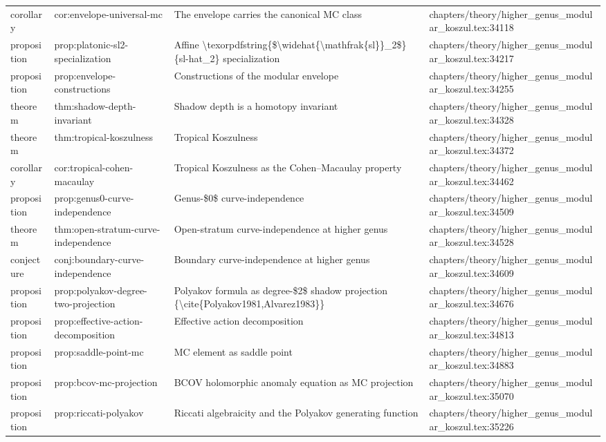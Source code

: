 \documentclass[11pt]{article}
\begin{document}
\begin{longtable}{L{0.10\textwidth}L{0.26\textwidth}L{0.42\textwidth}L{0.22\textwidth}}
corollary & cor:envelope-universal-mc & The envelope carries the canonical MC class & chapters/theory/higher\_genus\_modular\_koszul.tex:34118\\
proposition & prop:platonic-sl2-specialization & Affine \textbackslash{}texorpdfstring\{\$\textbackslash{}widehat\{\textbackslash{}mathfrak\{sl\}\}\_2\$\}\{sl-hat\_2\} specialization & chapters/theory/higher\_genus\_modular\_koszul.tex:34217\\
proposition & prop:envelope-constructions & Constructions of the modular envelope & chapters/theory/higher\_genus\_modular\_koszul.tex:34255\\
theorem & thm:shadow-depth-invariant & Shadow depth is a homotopy invariant & chapters/theory/higher\_genus\_modular\_koszul.tex:34328\\
theorem & thm:tropical-koszulness & Tropical Koszulness & chapters/theory/higher\_genus\_modular\_koszul.tex:34372\\
corollary & cor:tropical-cohen-macaulay & Tropical Koszulness as the Cohen--Macaulay property & chapters/theory/higher\_genus\_modular\_koszul.tex:34462\\
proposition & prop:genus0-curve-independence & Genus-\$0\$ curve-independence & chapters/theory/higher\_genus\_modular\_koszul.tex:34509\\
theorem & thm:op{}en-stratum-curve-independence & Op{}en-stratum curve-independence at higher genus & chapters/theory/higher\_genus\_modular\_koszul.tex:34528\\
conjecture & conj:boundary-curve-independence & Boundary curve-independence at higher genus & chapters/theory/higher\_genus\_modular\_koszul.tex:34609\\
proposition & prop:polyakov-degree-two-projection & Polyakov formula as degree-\$2\$ shadow projection \{\textbackslash{}cite\{Polyakov1981,Alvarez1983\}\} & chapters/theory/higher\_genus\_modular\_koszul.tex:34676\\
proposition & prop:effective-action-decomposition & Effective action decomposition & chapters/theory/higher\_genus\_modular\_koszul.tex:34813\\
proposition & prop:saddle-point-mc & MC element as saddle point & chapters/theory/higher\_genus\_modular\_koszul.tex:34883\\
proposition & prop:bcov-mc-projection & BCOV holomorphic anomaly equation as MC projection & chapters/theory/higher\_genus\_modular\_koszul.tex:35070\\
proposition & prop:riccati-polyakov & Riccati algebraicity and the Polyakov generating function & chapters/theory/higher\_genus\_modular\_koszul.tex:35226\\

\end{longtable}
\end{document}
